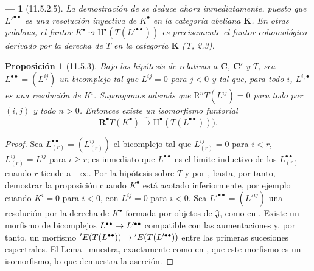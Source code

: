 \documentclass[10pt,oneside,openany]{book}
\theoremstyle{egaenv}\newtheorem*{env}{---}
\theoremstyle{egastatement}
\newtheorem*{proposition}{Proposición}
\theoremstyle{egadescription}
\renewcommand{\geq}{\geqslant}
\renewcommand{\to}{\mathchoice{\longrightarrow}{\rightarrow}{\rightarrow}{\rightarrow}}
\begin{document}
\begin{env}[11.5.2.5]
\label{0.11.5.2.5}
\label{0.11.5.2.5-fr}
La demostración de  se deduce ahora inmediatamente, puesto que $L'^{\bullet\bullet}$ es una resolución inyectiva de $K^\bullet$ \emph{en la categoría abeliana $\boldsymbol{K}$}.
En otras palabras, el funtor
$K^\bullet\leadsto\mathrm H^\bullet(T(L'^{\bullet\bullet}))$
es precisamente el funtor cohomológico \emph{derivado por la derecha} de $T$ en la categoría $\boldsymbol{K}$ (T, 2.3).
\end{env}

\begin{proposition}[11.5.3]
\label{0.11.5.3}
\label{0.11.5.3-fr}
Bajo las hipótesis de  relativas a $\boldsymbol{C}$, $\boldsymbol{C}'$ y $T$, sea $L^{\bullet\bullet}=(L^{ij})$ un bicomplejo tal que $L^{ij}=0$ para $j<0$ y tal que, para todo $i$, $L^{i,\bullet}$ es una resolución de $K^i$.
Supongamos además que $\mathrm R^nT(L^{ij})=0$ para todo par $(i,j)$ y todo $n>0$.
Entonces existe un isomorfismo funtorial
\[
  \label{0.11.5.3.1-fr}
  \mathbf R^\bullet T(K^\bullet)\xrightarrow{\sim}
  \mathrm H^\bullet(T(L^{\bullet\bullet}))).
  \tag{11.5.3.1}
\]
\end{proposition}

\begin{proof}
Sea $L_{(r)}^{\bullet\bullet}=(L_{(r)}^{ij})$ el bicomplejo tal que $L_{(r)}^{ij}=0$ para $i<r$, $L_{(r)}^{ij}=L^{ij}$ para $i\geq r$; es inmediato que $L^{\bullet\bullet}$ es el límite inductivo de los $L_{(r)}^{\bullet\bullet}$ cuando $r$ tiende a $-\infty$.
Por la hipótesis sobre $T$ y por , basta, por tanto, demostrar la proposición cuando $K^\bullet$ está acotado inferiormente, por ejemplo cuando $K^i=0$ para $i<0$, con $L^{ij}=0$ para $i<0$.
Sea $L'^{\bullet\bullet}=(L'^{ij})$ una resolución por la derecha de $K^\bullet$ formada por objetos de $\mathfrak J$, como en .
Existe un morfismo de bicomplejos
$L^{\bullet\bullet}\to L'^{\bullet\bullet}$
compatible con las aumentaciones y, por tanto, un morfismo
$'E(T(L^{\bullet\bullet}))\to{}'E(T(L'^{\bullet\bullet}))$
entre las primeras sucesiones espectrales.
El Lema~ muestra, exactamente como en , que este morfismo es un isomorfismo, lo que demuestra la aserción.
\end{proof}
\end{document}
